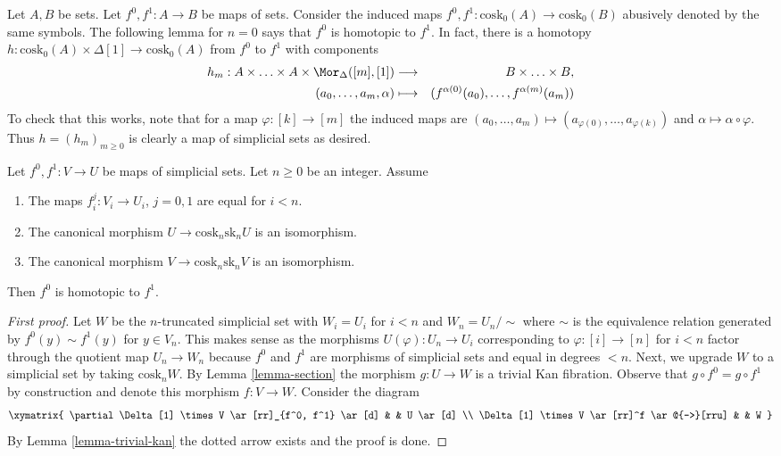 \noindent
Let $A, B$ be sets. Let $f^0, f^1 : A \to B$ be maps of sets.
Consider the induced maps $f^0, f^1 : \text{cosk}_0(A) \to \text{cosk}_0(B)$
abusively denoted by the same symbols. The following lemma for $n = 0$
says that $f^0$ is homotopic to $f^1$. In fact, there is a
homotopy $h : \text{cosk}_0(A) \times \Delta[1] \to \text{cosk}_0(A)$
from $f^0$ to $f^1$ with components
\begin{eqnarray*}
h_m : A \times \ldots \times A \times \Mor_{\Delta}([m], [1])
& \longrightarrow &
B \times \ldots \times B, \\
(a_0, \ldots, a_m, \alpha) & \longmapsto &
(f^{\alpha(0)}(a_0), \ldots, f^{\alpha(m)}(a_m))
\end{eqnarray*}
To check that this works, note that for a map $\varphi : [k] \to [m]$
the induced maps are
$(a_0, \ldots, a_m) \mapsto (a_{\varphi(0)}, \ldots, a_{\varphi(k)})$
and $\alpha \mapsto \alpha \circ \varphi$. Thus $h = (h_m)_{m \geq 0}$
is clearly a map of simplicial sets as desired.

\begin{lemma}
\label{lemma-homotopy}
Let $f^0, f^1 : V \to U$ be maps of simplicial sets.
Let $n \geq 0$ be an integer.
Assume
\begin{enumerate}
\item The maps $f^j_i : V_i \to U_i$, $j = 0, 1$ are equal for $i < n$.
\item The canonical morphism $U \to \text{cosk}_n \text{sk}_n U$
is an isomorphism.
\item The canonical morphism $V \to \text{cosk}_n \text{sk}_n V$
is an isomorphism.
\end{enumerate}
Then $f^0$ is homotopic to $f^1$.
\end{lemma}

\begin{proof}[First proof]
Let $W$ be the $n$-truncated simplicial set with $W_i = U_i$ for
$i < n$ and $W_n = U_n / \sim$ where $\sim$ is the equivalence relation
generated by $f^0(y) \sim f^1(y)$ for $y \in V_n$. This makes sense
as the morphisms $U(\varphi) : U_n \to U_i$ corresponding to
$\varphi : [i] \to [n]$ for $i < n$ factor through the quotient map
$U_n \to W_n$ because $f^0$ and $f^1$ are morphisms of simplicial sets and
equal in degrees $< n$. Next, we upgrade $W$ to a simplicial set
by taking $\text{cosk}_n W$. By Lemma \ref{lemma-section}
the morphism $g : U \to W$ is a trivial Kan fibration. Observe
that $g \circ f^0 = g \circ f^1$ by construction and denote
this morphism $f : V \to W$. Consider the diagram
$$
\xymatrix{
\partial \Delta[1] \times V \ar[rr]_{f^0, f^1} \ar[d] & & U \ar[d] \\
\Delta[1] \times V \ar[rr]^f \ar@{-->}[rru] & & W
}
$$
By Lemma \ref{lemma-trivial-kan} the dotted arrow exists and the proof is done.
\end{proof}

